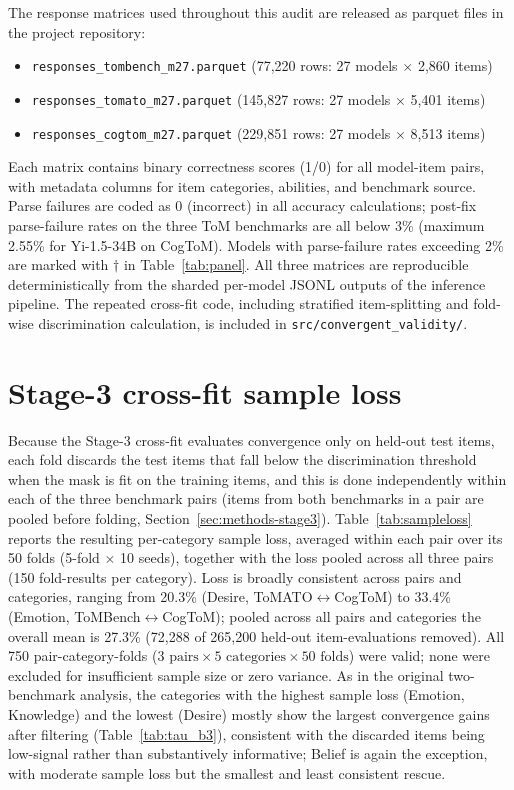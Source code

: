 \documentclass{article} %
\begin{document}
The response matrices used throughout this audit are released as parquet files in the project repository:
\begin{itemize}
\item \texttt{responses\_tombench\_m27.parquet} (77{,}220 rows: 27 models $\times$ 2{,}860 items)
\item \texttt{responses\_tomato\_m27.parquet} (145{,}827 rows: 27 models $\times$ 5{,}401 items)
\item \texttt{responses\_cogtom\_m27.parquet} (229{,}851 rows: 27 models $\times$ 8{,}513 items)
\end{itemize}
 
Each matrix contains binary correctness scores (1/0) for all model-item pairs, with metadata columns for item categories, abilities, and benchmark source. Parse failures are coded as 0 (incorrect) in all accuracy calculations; post-fix parse-failure rates on the three ToM benchmarks are all below 3\% (maximum 2.55\% for Yi-1.5-34B on CogToM). Models with parse-failure rates exceeding 2\% are marked with $\dagger$ in Table~\ref{tab:panel}. All three matrices are reproducible deterministically from the sharded per-model JSONL outputs of the inference pipeline. The repeated cross-fit code, including stratified item-splitting and fold-wise discrimination calculation, is included in \texttt{src/convergent\_validity/}. 
 
\section{Stage-3 cross-fit sample loss}
\label{app:sampleloss}
 
Because the Stage-3 cross-fit evaluates convergence only on held-out test items, each fold discards the test items that fall below the discrimination threshold when the mask is fit on the training items, and this is done independently within each of the three benchmark pairs (items from both benchmarks in a pair are pooled before folding, Section~\ref{sec:methods-stage3}). Table~\ref{tab:sampleloss} reports the resulting per-category sample loss, averaged within each pair over its 50 folds (5-fold $\times$ 10 seeds), together with the loss pooled across all three pairs (150 fold-results per category). Loss is broadly consistent across pairs and categories, ranging from 20.3\% (Desire, ToMATO$\leftrightarrow$CogToM) to 33.4\% (Emotion, ToMBench$\leftrightarrow$CogToM); pooled across all pairs and categories the overall mean is 27.3\% (72{,}288 of 265{,}200 held-out item-evaluations removed). All 750 pair-category-folds ($3\text{ pairs}\times5\text{ categories}\times50\text{ folds}$) were valid; none were excluded for insufficient sample size or zero variance. As in the original two-benchmark analysis, the categories with the highest sample loss (Emotion, Knowledge) and the lowest (Desire) mostly show the largest convergence gains after filtering (Table~\ref{tab:tau_b3}), consistent with the discarded items being low-signal rather than substantively informative; Belief is again the exception, with moderate sample loss but the smallest and least consistent rescue.
 
\end{document}
